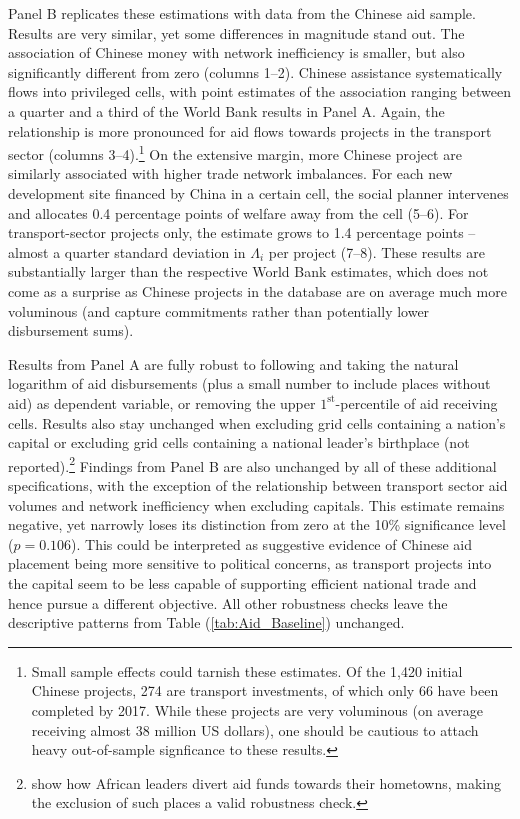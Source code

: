\documentclass[11pt, oneside]{article}   	%
\let\oldref\ref
\renewcommand{\ref}[1]{(\oldref{#1})}
\begin{document}
Panel B replicates these estimations with data from the Chinese aid sample. Results are very similar, yet some differences in magnitude stand out. The association of Chinese money with network inefficiency is smaller, but also significantly different from zero (columns 1--2). Chinese assistance systematically flows into privileged cells, with point estimates of the association ranging between a quarter and a third of the World Bank results in Panel A. Again, the relationship is more pronounced for aid flows towards projects in the transport sector (columns 3--4).\footnote{Small sample effects could tarnish these estimates. Of the 1,420 initial Chinese projects, 274 are transport investments, of which only 66 have been completed by 2017. While these projects are very voluminous (on average receiving almost 38 million US dollars), one should be cautious to attach heavy out-of-sample signficance to these results.} On the extensive margin, more Chinese project are similarly associated with higher trade network imbalances. For each new development site financed by China in a certain cell, the social planner intervenes and allocates 0.4 percentage points of welfare away from the cell (5--6). For transport-sector projects only, the estimate grows to 1.4 percentage points -- almost a quarter standard deviation in $\Lambda_{i}$ per project (7--8). These results are substantially larger than the respective World Bank estimates, which does not come as a surprise as Chinese projects in the database are on average much more voluminous (and capture commitments rather than potentially lower disbursement sums).

Results from Panel A are fully robust to following \cite{Dreher_Aidgrowthregional_2015} and taking the natural logarithm of aid disbursements (plus a small number to include places without aid) as dependent variable, or removing the upper $1^{\textrm{st}}$-percentile of aid receiving cells. Results also stay unchanged when excluding grid cells containing a nation's capital or excluding grid cells containing a national leader's birthplace (not reported).\footnote{\cite{Dreher_AiddemandAfrican_2016} show how African leaders divert aid funds towards their hometowns, making the exclusion of such places a valid robustness check.} Findings from Panel B are also unchanged by all of these additional specifications, with the exception of the relationship between transport sector aid volumes and network inefficiency when excluding capitals. This estimate remains negative, yet narrowly loses its distinction from zero at the 10\% significance level ($p = 0.106$). This could be interpreted as suggestive evidence of Chinese aid placement being more sensitive to political concerns, as transport projects into the capital seem to be less capable of supporting efficient national trade and hence pursue a different objective. All other robustness checks leave the descriptive patterns from Table \ref{tab:Aid_Baseline} unchanged.
\end{document}
